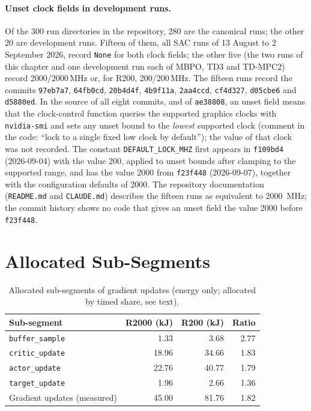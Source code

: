 \paragraph{Unset clock fields in development runs.}
Of the \num{300} run directories in the repository, \num{280} are the canonical runs; the other \num{20} are development runs.
Fifteen of them, all SAC runs of 13 August to 2 September 2026, record \texttt{None} for both clock fields; the other five (the two runs of this chapter and one development run each of MBPO, TD3 and TD-MPC2) record \num{2000}/\num{2000}\,MHz or, for R200, \num{200}/\num{200}\,MHz.
The fifteen runs record the commits \texttt{97eb7a7}, \texttt{64fb0cd}, \texttt{20b4d4f}, \texttt{4b9f11a}, \texttt{2aa4ccd}, \texttt{cf4d327}, \texttt{d05cbe6} and \texttt{d5880ed}.
In the source of all eight commits, and of \texttt{ae38808}, an unset field means that the clock-control function queries the supported graphics clocks with \texttt{nvidia-smi} and sets any unset bound to the \emph{lowest} supported clock (comment in the code: ``lock to a single fixed low clock by default''); the value of that clock was not recorded.
The constant \texttt{DEFAULT\_\allowbreak LOCK\_\allowbreak MHZ} first appears in \texttt{f109bd4} (2026-09-04) with the value \num{200}, applied to unset bounds after clamping to the supported range, and has the value \num{2000} from \texttt{f23f448} (2026-09-07), together with the configuration defaults of \num{2000}.
The repository documentation (\texttt{README.md} and \texttt{CLAUDE.md}) describes the fifteen runs as equivalent to \SI{2000}{\mega\hertz}; the commit history shows no code that gives an unset field the value \num{2000} before \texttt{f23f448}.

\section{Allocated Sub-Segments}
\label{app:clock-suballoc}

\begin{table}[tbp]
  \centering
  \caption{Allocated sub-segments of gradient updates (energy only; allocated by timed share, see text).}
  \label{tab:app-clock-suballoc}
  \begin{tabular}{lrrr}
    \toprule
    Sub-segment                 & R2000 (kJ) & R200 (kJ) & Ratio \\
    \midrule
    \texttt{buffer\_\allowbreak sample} & 1.33 & 3.68 & 2.77 \\
    \texttt{critic\_\allowbreak update} & 18.96 & 34.66 & 1.83 \\
    \texttt{actor\_\allowbreak update} & 22.76 & 40.77 & 1.79 \\
    \texttt{target\_\allowbreak update} & 1.96 & 2.66 & 1.36 \\
    \midrule
    Gradient updates (measured) & 45.00 & 81.76 & 1.82 \\
    \bottomrule
  \end{tabular}
\end{table}

